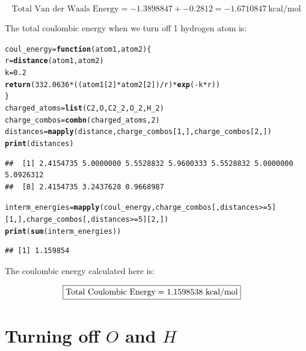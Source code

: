 \documentclass{article}\usepackage[]{graphicx}\usepackage[]{color}
\makeatletter
\newcommand{\hlnum}[1]{\textcolor[rgb]{0.686,0.059,0.569}{#1}}%
\newcommand{\hlopt}[1]{\textcolor[rgb]{0,0,0}{#1}}%
\newcommand{\hlstd}[1]{\textcolor[rgb]{0.345,0.345,0.345}{#1}}%
\newcommand{\hlkwa}[1]{\textcolor[rgb]{0.161,0.373,0.58}{\textbf{#1}}}%
\newcommand{\hlkwb}[1]{\textcolor[rgb]{0.69,0.353,0.396}{#1}}%
\newcommand{\hlkwc}[1]{\textcolor[rgb]{0.333,0.667,0.333}{#1}}%
\newcommand{\hlkwd}[1]{\textcolor[rgb]{0.737,0.353,0.396}{\textbf{#1}}}%
\newenvironment{kframe}{%
 \def\at@end@of@kframe{}%
 \ifinner\ifhmode%
  \def\at@end@of@kframe{\end{minipage}}%
  \begin{minipage}{\columnwidth}%
 \fi\fi%
 \def\FrameCommand##1{\hskip\@totalleftmargin \hskip-\fboxsep
 \colorbox{shadecolor}{##1}\hskip-\fboxsep
     \hskip-\linewidth \hskip-\@totalleftmargin \hskip\columnwidth}%
 \MakeFramed {\advance\hsize-\width
   \@totalleftmargin\z@ \linewidth\hsize
   \@setminipage}}%
 {\par\unskip\endMakeFramed%
 \at@end@of@kframe}
\newenvironment{knitrout}{}{} %
\makeatother
\begin{document}
$$\boxed{\text{Total Van der Waals Energy}=-1.3898847+-0.2812=-1.6710847\ \text{kcal/mol}}$$

The total coulombic energy when we turn off 1 hydrogen atom is:

\begin{knitrout}
\color{fgcolor}\begin{kframe}
\begin{alltt}
  \hlstd{coul_energy}\hlkwb{=}\hlkwa{function}\hlstd{(}\hlkwc{atom1}\hlstd{,}\hlkwc{atom2}\hlstd{)\{}
    \hlstd{r}\hlkwb{=}\hlkwd{distance}\hlstd{(atom1,atom2)}
    \hlstd{k}\hlkwb{=}\hlnum{0.2}
    \hlkwd{return}\hlstd{(}\hlnum{332.0636}\hlopt{*}\hlstd{((atom1[}\hlnum{2}\hlstd{]}\hlopt{*}\hlstd{atom2[}\hlnum{2}\hlstd{])}\hlopt{/}\hlstd{r)}\hlopt{*}\hlkwd{exp}\hlstd{(}\hlopt{-}\hlstd{k}\hlopt{*}\hlstd{r))}
  \hlstd{\}}
  \hlstd{charged_atoms} \hlkwb{=} \hlkwd{list}\hlstd{(C2,O,C2_2,O_2,H_2)}
  \hlstd{charge_combos} \hlkwb{=} \hlkwd{combn}\hlstd{(charged_atoms,}\hlnum{2}\hlstd{)}
  \hlstd{distances}\hlkwb{=}\hlkwd{mapply}\hlstd{(distance,charge_combos[}\hlnum{1}\hlstd{,],charge_combos[}\hlnum{2}\hlstd{,])}
  \hlkwd{print}\hlstd{(distances)}
\end{alltt}
\begin{verbatim}
##  [1] 2.4154735 5.0000000 5.5528832 5.9600333 5.5528832 5.0000000 5.0926312
##  [8] 2.4154735 3.2437628 0.9668987
\end{verbatim}
\begin{alltt}
  \hlstd{interm_energies} \hlkwb{=} \hlkwd{mapply}\hlstd{(coul_energy,charge_combos[,distances}\hlopt{>=}\hlnum{5}\hlstd{][}\hlnum{1}\hlstd{,],charge_combos[,distances}\hlopt{>=}\hlnum{5}\hlstd{][}\hlnum{2}\hlstd{,])}
  \hlkwd{print}\hlstd{(}\hlkwd{sum}\hlstd{(interm_energies))}
\end{alltt}
\begin{verbatim}
## [1] 1.159854
\end{verbatim}
\end{kframe}
\end{knitrout}

The coulombic energy calculated here is:

\begin{align*}
  \Aboxed{\text{Total Coulombic Energy}=1.1598538\ \text{kcal/mol}}
\end{align*}

\section{Turning off $O$ and $H$}
\end{document}

